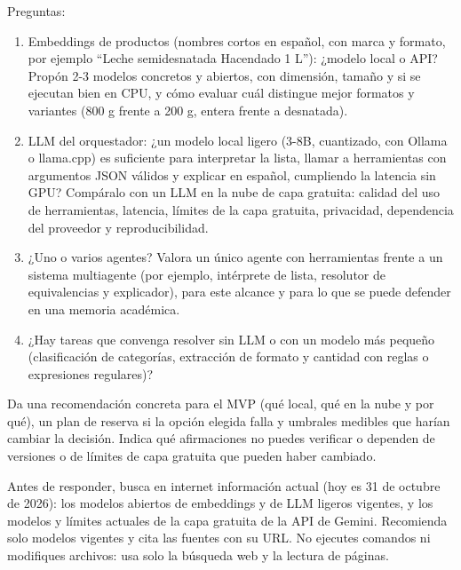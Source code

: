 \begin{tcolorbox}[colback=promptcolor, title=Prompt Introducido, colframe=blue!50!black, breakable]
	Preguntas:
	\begin{enumerate}
		\item Embeddings de productos (nombres cortos en español, con marca y formato, por ejemplo ``Leche semidesnatada Hacendado 1 L''): ¿modelo local o API? Propón 2-3 modelos concretos y abiertos, con dimensión, tamaño y si se ejecutan bien en CPU, y cómo evaluar cuál distingue mejor formatos y variantes (800 g frente a 200 g, entera frente a desnatada).
		\item LLM del orquestador: ¿un modelo local ligero (3-8B, cuantizado, con Ollama o llama.cpp) es suficiente para interpretar la lista, llamar a herramientas con argumentos JSON válidos y explicar en español, cumpliendo la latencia sin GPU? Compáralo con un LLM en la nube de capa gratuita: calidad del uso de herramientas, latencia, límites de la capa gratuita, privacidad, dependencia del proveedor y reproducibilidad.
		\item ¿Uno o varios agentes? Valora un único agente con herramientas frente a un sistema multiagente (por ejemplo, intérprete de lista, resolutor de equivalencias y explicador), para este alcance y para lo que se puede defender en una memoria académica.
		\item ¿Hay tareas que convenga resolver sin LLM o con un modelo más pequeño (clasificación de categorías, extracción de formato y cantidad con reglas o expresiones regulares)?
	\end{enumerate}

	Da una recomendación concreta para el MVP (qué local, qué en la nube y por qué), un plan de reserva si la opción elegida falla y umbrales medibles que harían cambiar la decisión. Indica qué afirmaciones no puedes verificar o dependen de versiones o de límites de capa gratuita que pueden haber cambiado.

	Antes de responder, busca en internet información actual (hoy es 31 de octubre de 2026): los modelos abiertos de embeddings y de LLM ligeros vigentes, y los modelos y límites actuales de la capa gratuita de la API de Gemini. Recomienda solo modelos vigentes y cita las fuentes con su URL. No ejecutes comandos ni modifiques archivos: usa solo la búsqueda web y la lectura de páginas.
\end{tcolorbox}

